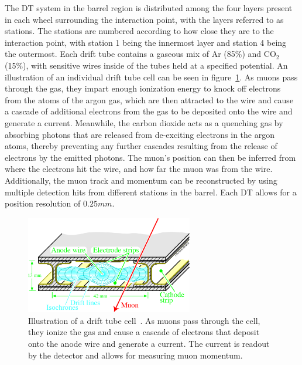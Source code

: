 The DT system in the barrel region is distributed among the four layers present in each wheel surrounding the interaction point, with the layers referred to as stations.
The stations are numbered according to how close they are to the interaction point, with station 1 being the innermost layer and station 4 being the outermost.
Each drift tube contains a gaseous mix of Ar (85\%) and CO$_2$ (15\%), with sensitive wires inside of the tubes held at a specified potential.
An illustration of an individual drift tube cell can be seen in figure~\ref{fig:CMSDTcell}.
As muons pass through the gas, they impart enough ionization energy to knock off electrons from the atoms of the argon gas, which are then attracted to the wire and cause a cascade of additional electrons from the gas to be deposited onto the wire and generate a current.
Meanwhile, the carbon dioxide acts as a quenching gas by absorbing photons that are released from de-exciting electrons in the argon atoms, thereby preventing any further cascades resulting from the release of electrons by the emitted photons.
The muon's position can then be inferred from where the electrons hit the wire, and how far the muon was from the wire.
Additionally, the muon track and momentum can be reconstructed by using multiple detection hits from different stations in the barrel.
Each DT allows for a position resolution of $0.25\unit{mm}$.

\begin{figure}[htbp]
  \centering
  \includegraphics[width=0.65\textwidth]{fig/experiment/cms_DTcell.pdf}
  \caption[
    Illustration of a drift tube cell.
    As muons pass through the cell, they ionize the gas and cause a cascade of electrons that deposit onto the anode wire and generate a current.
    The current is readout by the detector and allows for measuring muon momentum.
  ]{
    Illustration of a drift tube cell~\cite{Abbiendi_2019}.
    As muons pass through the cell, they ionize the gas and cause a cascade of electrons that deposit onto the anode wire and generate a current.
    The current is readout by the detector and allows for measuring muon momentum.
  }
  \label{fig:CMSDTcell}
\end{figure}

